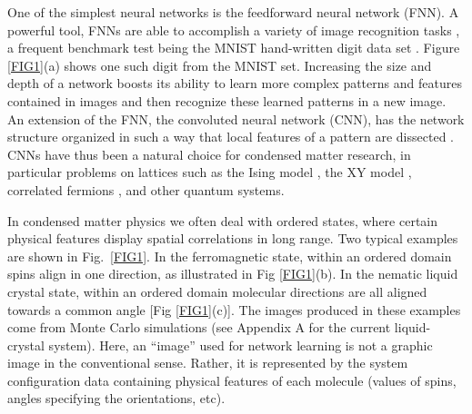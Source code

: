 One of the simplest neural networks is the feedforward neural network (FNN). A powerful tool, FNNs are able to accomplish a variety of image recognition tasks \cite{schmidhuber_deep}, a frequent benchmark test being the MNIST hand-written digit data set \cite{mnistset}. Figure \ref{FIG1}(a) shows one such digit from the MNIST set. Increasing the size and depth of a network boosts its ability to learn more complex patterns and features contained in images and then recognize these learned patterns in a new image.
An extension of the FNN, the convoluted neural network (CNN), has the network structure organized in such a way that local features of a pattern are dissected \cite{cnnmnist}.
CNNs have thus been a natural choice for condensed matter research, in particular problems on lattices such as the Ising model \cite{carras}, the XY model \cite{beach}, correlated fermions \cite{broecker,chng}, and other quantum systems.

In condensed matter physics we often deal with ordered states, where
certain physical features display spatial correlations in long range. Two typical examples are shown in Fig.\ \ref{FIG1}. In the ferromagnetic state, within an ordered domain spins align in one direction, as illustrated in Fig \ref{FIG1}(b). In the nematic liquid crystal state, within an ordered domain molecular directions are all aligned towards a common angle [Fig \ref{FIG1}(c)].
The images produced in these examples come from Monte Carlo simulations (see Appendix A for the current liquid-crystal system).
Here, an ``image'' used for network learning is not a graphic image in the conventional sense. Rather, it is represented by the system configuration data containing physical features of each molecule (values of spins, angles specifying the orientations, etc).

